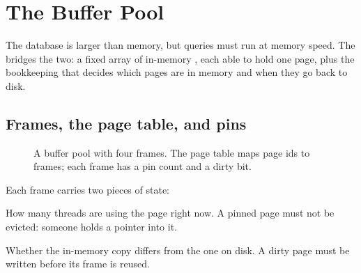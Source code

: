 \chapter{The Buffer Pool}
\label{ch:buffer}

The database is larger than memory, but queries must run at memory speed. The
 bridges the two: a fixed array of in-memory ,
each able to hold one page, plus the bookkeeping that decides which pages are
in memory and when they go back to disk.

\section{Frames, the page table, and pins}

\begin{figure}[ht]
\centering
{}
\caption{A buffer pool with four frames. The page table maps page ids to frames; each frame has a pin count and a dirty bit.}
\label{fig:bpm}
\end{figure}

Each frame carries two pieces of state:

\begin{description}[leftmargin=1.2em]
\item[Pin count.] How many threads are using the page right now. A pinned page must not be evicted: someone holds a pointer into it.
\item[Dirty bit.] Whether the in-memory copy differs from the one on disk. A dirty page must be written before its frame is reused.
\end{description}

